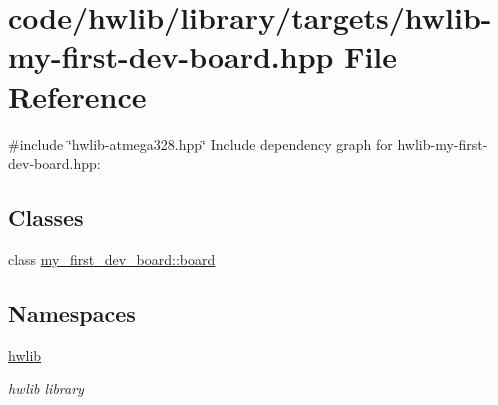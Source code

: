 \hypertarget{hwlib-my-first-dev-board_8hpp}{}\section{code/hwlib/library/targets/hwlib-\/my-\/first-\/dev-\/board.hpp File Reference}
\label{hwlib-my-first-dev-board_8hpp}
{\ttfamily \#include \char`\"{}hwlib-\/atmega328.\+hpp\char`\"{}}\newline
Include dependency graph for hwlib-\/my-\/first-\/dev-\/board.hpp\+:
\subsection*{Classes}
\begin{DoxyCompactItemize}
\item 
class \hyperlink{classmy__first__dev__board_1_1board}{my\+\_\+first\+\_\+dev\+\_\+board\+::board}
\end{DoxyCompactItemize}
\subsection*{Namespaces}
\begin{DoxyCompactItemize}
\item 
 \hyperlink{namespacehwlib}{hwlib}
\begin{DoxyCompactList}\small\item\em hwlib library \end{DoxyCompactList}\end{DoxyCompactItemize}
